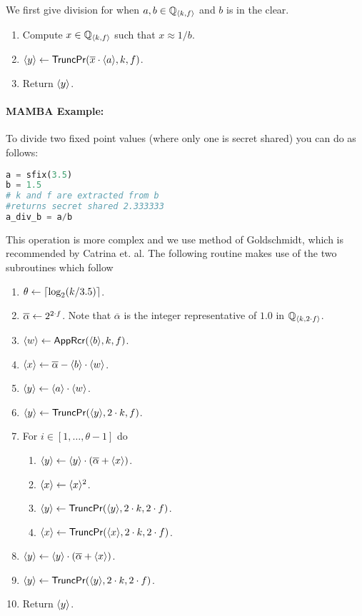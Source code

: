   We first give division for when $a, b \in {\mathbb{Q}}_{\langle k, f \rangle}$ and $b$ is in the clear.
  \begin{enumerate}
    \item Compute $x \in {\mathbb{Q}}_{\langle k, f \rangle}$ such that $x \approx 1/b$.
    \item $\langle y \rangle \leftarrow \mathsf{TruncPr}(\overline{x} \cdot \langle a \rangle,k,f)$.
    \item Return $\langle y \rangle$.
  \end{enumerate}

  \paragraph{MAMBA Example:} To divide two fixed point values (where only one is secret shared) you can do as follows:
  \begin{lstlisting}[language={python}]
a = sfix(3.5)
b = 1.5
# k and f are extracted from b
#returns secret shared 2.333333
a_div_b = a/b
\end{lstlisting}
  This operation is more complex and we use method of Goldschmidt, which
  is recommended by Catrina et. al.
  The following routine makes use of the two subroutines which follow
  \begin{enumerate}
    \item $\theta \leftarrow {\lceil \log_2 (k/3.5) \rceil}$.
    \item $\overline{\alpha} \leftarrow 2^{2 \cdot f}$.
          Note that $\overline{\alpha}$ is the integer representative of $1.0$ in ${\mathbb{Q}}_{\langle k, 2\cdot f \rangle}$.
    \item $\langle w \rangle \leftarrow \mathsf{AppRcr}(\langle b \rangle,k,f)$.
    \item $\langle x \rangle \leftarrow \overline{\alpha} - \langle b \rangle\cdot \langle w \rangle$.
    \item $\langle y \rangle \leftarrow \langle a \rangle\cdot \langle w \rangle$.
    \item $\langle y \rangle \leftarrow \mathsf{TruncPr}(\langle y \rangle,2\cdot k,f)$.
    \item For $i \in [1,\ldots,\theta-1]$ do
          \begin{enumerate}
            \item $\langle y \rangle \leftarrow \langle y \rangle \cdot (\overline{\alpha}+\langle x \rangle)$.
            \item $\langle x \rangle \leftarrow \langle x \rangle^2$.
            \item $\langle y \rangle \leftarrow \mathsf{TruncPr}(\langle y \rangle,2\cdot k,2 \cdot f)$.
            \item $\langle x \rangle \leftarrow \mathsf{TruncPr}(\langle x \rangle,2\cdot k,2 \cdot f)$.
          \end{enumerate}
    \item $\langle y \rangle \leftarrow \langle y \rangle \cdot (\overline{\alpha}+\langle x \rangle)$.
    \item $\langle y \rangle \leftarrow \mathsf{TruncPr}(\langle y \rangle,2\cdot k,2 \cdot f)$.
    \item Return $\langle y \rangle$.
  \end{enumerate}
